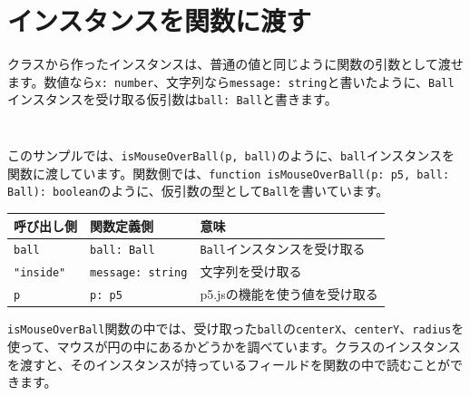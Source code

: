 \section{インスタンスを関数に渡す}

クラスから作ったインスタンスは、普通の値と同じように関数の引数として渡せます。数値なら\texttt{x: number}、文字列なら\texttt{message: string}と書いたように、\texttt{Ball}インスタンスを受け取る仮引数は\texttt{ball: Ball}と書きます。

\begin{listing}[htbp]
\inputminted[firstline=1,lastline=26]{ts}{typescript-p5/listings/chapter11/ball-instance-as-argument.ts}
\caption{関数に渡すBallクラス（\texttt{chapter11/ball-instance-as-argument.ts}）}
\label{lst:chapter11-ball-instance-as-argument-class}
\end{listing}

\begin{listing}[htbp]
\inputminted[firstline=28,lastline=65]{ts}{typescript-p5/listings/chapter11/ball-instance-as-argument.ts}
\caption{Ballインスタンスを関数の引数として渡す（\texttt{chapter11/ball-instance-as-argument.ts}）}
\label{lst:chapter11-ball-instance-as-argument-functions}
\end{listing}

このサンプルでは、\texttt{isMouseOverBall(p, ball)}のように、\texttt{ball}インスタンスを関数に渡しています。関数側では、\texttt{function isMouseOverBall(p: p5, ball: Ball): boolean}のように、仮引数の型として\texttt{Ball}を書いています。

\begin{center}
\begin{tabular}{lll}
\toprule
呼び出し側 & 関数定義側 & 意味 \\
\midrule
\texttt{ball} & \texttt{ball: Ball} & \texttt{Ball}インスタンスを受け取る \\
\texttt{"inside"} & \texttt{message: string} & 文字列を受け取る \\
\texttt{p} & \texttt{p: p5} & p5.jsの機能を使う値を受け取る \\
\bottomrule
\end{tabular}
\end{center}

\texttt{isMouseOverBall}関数の中では、受け取った\texttt{ball}の\texttt{centerX}、\texttt{centerY}、\texttt{radius}を使って、マウスが円の中にあるかどうかを調べています。クラスのインスタンスを渡すと、そのインスタンスが持っているフィールドを関数の中で読むことができます。


